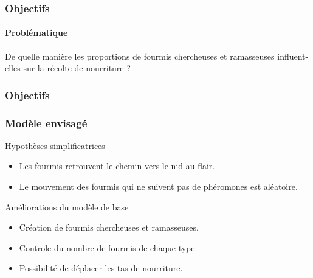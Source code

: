 \documentclass[11pt]{beamer}
\begin{document}
\begin{frame}
\frametitle{Objectifs}
\framesubtitle{Problématique}
\begin{center} De quelle manière les proportions de fourmis chercheuses et ramasseuses influent-elles sur la récolte de nourriture ?
\end{center}
\end{frame}

\begin{frame}

\frametitle{Objectifs}
\frametitle{Modèle envisagé}
\begin{block}{Hypothèses simplificatrices}
\begin{itemize}
\item Les fourmis retrouvent le chemin vers le nid au flair.
\item Le mouvement des fourmis qui ne suivent pas de phéromones est aléatoire.
\end{itemize}
\end{block}
\begin{block}{Améliorations du modèle de base}
\begin{itemize}
\item Création de fourmis chercheuses et ramasseuses.
\item Controle du nombre de fourmis de chaque type.
\item Possibilité de déplacer les tas de nourriture.
\end{itemize}
\end{block}
\end{frame}
\end{document}
